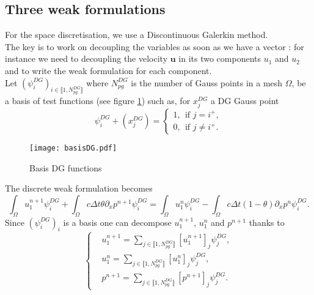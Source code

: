 \documentclass[a4paper, 11pt]{report}
\begin{document}
\subsection{Three weak formulations}
For the space discretisation, we use a Discontinuous Galerkin method.\\
The key is to work on decoupling the variables as soon as we have a vector : for instance we need to decoupling the velocity $\boldsymbol{u}$ in its two components $u_1$ and $u_2$ and to write the weak formulation for each component.\\
Let $\left(\psi^{DG}_i\right)_{i\in\llbracket1,N_{pg}^{DG}\rrbracket}$ where $N_{pg}^{DG}$ is the number of Gauss points in a mesh $\Omega$, be a basis of test functions (see figure \ref{basisfunction}) such as, for $x_j^{DG}$ a DG Gauss point \begin{equation*}\psi^{DG}_i+(x_j^{DG}) =\left\{\begin{split}1, \ \ \text{if } j=i^+,\\
0,\ \ \text{if } j\neq i^+.\end{split}\right.
\end{equation*}
\begin{figure}
\begin{center}
\texttt{[image: basisDG.pdf]}
\caption{Basis DG functions}
\label{basisfunction}
\end{center}
\end{figure}
The discrete weak formulation becomes 
\begin{equation*}
\int_{\Omega}u_1^{n+1}\psi^{DG}_i+\int_{\Omega}c\Delta t\theta\partial_x p^{n+1}\psi^{DG}_i=\int_{\Omega}u_1^{n}\psi^{DG}_i-\int_{\Omega}c\Delta t(1-\theta)\partial_x p^n\psi^{DG}_i.
\end{equation*}
Since $\left(\psi^{DG}_i\right)_i$ is a basis one can decompose $u_1^{n+1}$, $u_1^n$ and $p^{n+1}$ thanks to
\begin{equation*}
\left\{
\begin{split}
&u_1^{n+1}=\sum_{j\in\llbracket1,N_{pg}^{DG}\rrbracket}\left[u_1^{n+1}\right]_j\psi^{DG}_j,\\
&u_1^{n}=\sum_{j\in\llbracket1,N_{pg}^{DG}\rrbracket}\left[u_1^{n}\right]_j\psi^{DG}_j,\\
&p^{n+1}=\sum_{j\in\llbracket1,N_{pg}^{DG}\rrbracket}\left[p^{n+1}\right]_j\psi^{DG}_j.
\end{split}\right.
\end{equation*}
\end{document}
